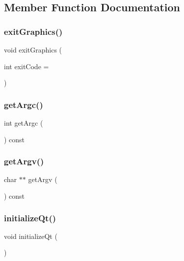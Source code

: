 \subsection{Member Function Documentation}
\mbox{\label{classQtGui_ac202b7b117db218b20100ff50ac06613}} 
\subsubsection{\texorpdfstring{exit\+Graphics()}{exitGraphics()}}
{\footnotesize\ttfamily void exit\+Graphics (\begin{DoxyParamCaption}\item[{int}]{exit\+Code = {} }\end{DoxyParamCaption})}

\mbox{\label{classQtGui_ac305f93c30c0ae9ff4266c83ba46a168}} 
\subsubsection{\texorpdfstring{get\+Argc()}{getArgc()}}
{\footnotesize\ttfamily int get\+Argc (\begin{DoxyParamCaption}{ }\end{DoxyParamCaption}) const}

\mbox{\label{classQtGui_a46e4245c4928dc68df6adb79042ca3d5}} 
\subsubsection{\texorpdfstring{get\+Argv()}{getArgv()}}
{\footnotesize\ttfamily char $\ast$$\ast$ get\+Argv (\begin{DoxyParamCaption}{ }\end{DoxyParamCaption}) const}

\mbox{\label{classQtGui_adb686b20d7ffc27cb775f329d62ec04a}} 
\subsubsection{\texorpdfstring{initialize\+Qt()}{initializeQt()}}
{\footnotesize\ttfamily void initialize\+Qt (\begin{DoxyParamCaption}{ }\end{DoxyParamCaption})}

